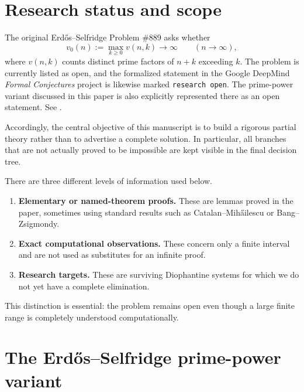 \documentclass[11pt]{article}
\begin{document}
\begin{abstract}
An exact finite computation up to \(5\cdot 10^7\), recorded together with the
research code, finds no new exceptions and exhibits a very rigid hierarchy of
minimal witnesses.  We emphasize throughout the distinction between
proved statements, named-theorem consequences, and computational observations.

\end{abstract}

\section{Research status and scope}

The original Erd\H{o}s--Selfridge Problem \#889 asks whether
\[
v_0(n):=\max_{k\geq 0} v(n,k)\longrightarrow\infty
\qquad (n\to\infty),
\]
where \(v(n,k)\) counts distinct prime factors of \(n+k\) exceeding \(k\).
The problem is currently listed as open, and the formalized statement in the
Google DeepMind \emph{Formal Conjectures} project is likewise marked
\texttt{research open}.  The prime-power variant discussed in this paper is
also explicitly represented there as an open statement.  See
\cite{erdos1967,erdosproblems,formal889}.

Accordingly, the central objective of this manuscript is to build a rigorous
partial theory rather than to advertise a complete solution.  In particular,
all branches that are not actually proved to be impossible are kept visible
in the final decision tree.

There are three different levels of information used below.

\begin{enumerate}[label=(\roman*)]
    \item \textbf{Elementary or named-theorem proofs.}
    These are lemmas proved in the paper, sometimes using standard results such
    as Catalan--Mih\H ailescu or Bang--Zsigmondy.
    \item \textbf{Exact computational observations.}
    These concern only a finite interval and are not used as substitutes for
    an infinite proof.
    \item \textbf{Research targets.}
    These are surviving Diophantine systems for which we do not yet have a
    complete elimination.
\end{enumerate}

This distinction is essential: the problem remains open even though a large
finite range is completely understood computationally.

\section{The Erd\H{o}s--Selfridge prime-power variant}
\end{document}
